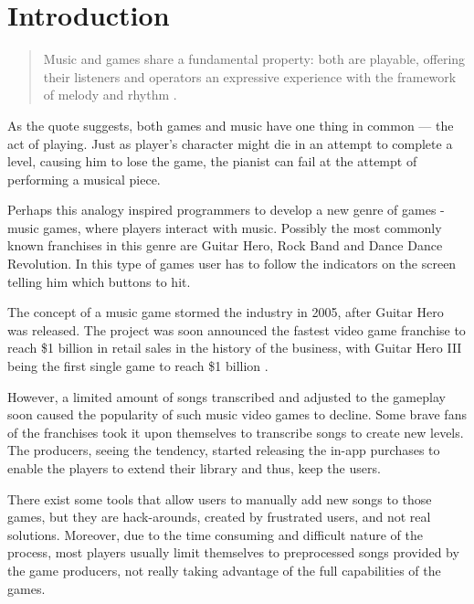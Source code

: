 
\chapter{Introduction} %

\label{Chapter3} %



\begin{quotation}
Music and games share a fundamental property: both are playable, offering their listeners and operators an expressive experience with the framework of melody and rhythm \cite{introquote}.
\end{quotation} 

As the quote suggests, both games and music have one thing in common — the act of playing. Just as player’s character might die in an attempt to complete a level, causing him to lose the game, the pianist can fail at the attempt of performing a musical piece. 

Perhaps this analogy inspired programmers to develop a new genre of games - music games, where players interact with music. Possibly the most commonly known franchises in this genre are Guitar Hero, Rock Band and Dance Dance Revolution. In this type of games user has to follow the indicators on the screen telling him which buttons to hit. 

The concept of a music game stormed the industry in 2005, after Guitar Hero was released. The project was soon announced the fastest video game franchise to reach \$1 billion in retail sales in the history of the business, with Guitar Hero III being the first single game to reach \$1 billion \cite{GHSales}.

However, a limited amount of songs transcribed and adjusted to the gameplay soon caused the popularity of such music video games to decline. Some brave fans of the franchises took it upon themselves to transcribe songs to create new levels. The producers, seeing the tendency, started releasing the in-app purchases to enable the players to extend their library and thus, keep the users. 

There exist some tools that allow users to manually add new songs to those games, but they are hack-arounds, created by frustrated users, and not real solutions. Moreover, due to the time consuming and difficult nature of the process, most players usually limit themselves to preprocessed songs provided by the game producers, not really taking advantage of the full capabilities of the games. 

